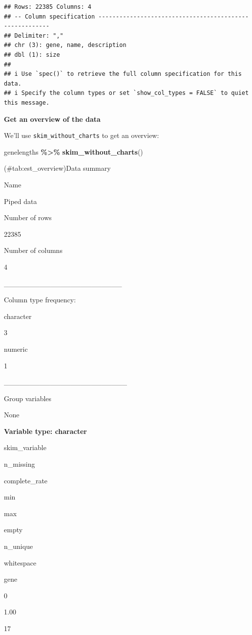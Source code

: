 \documentclass[
]{book}
\newenvironment{Shaded}{\begin{snugshade}}{\end{snugshade}}
\newcommand{\FunctionTok}[1]{\textcolor[rgb]{0.13,0.29,0.53}{\textbf{#1}}}
\newcommand{\NormalTok}[1]{#1}
\newcommand{\SpecialCharTok}[1]{\textcolor[rgb]{0.81,0.36,0.00}{\textbf{#1}}}
\begin{document}
\begin{verbatim}
## Rows: 22385 Columns: 4
## -- Column specification --------------------------------------------------------
## Delimiter: ","
## chr (3): gene, name, description
## dbl (1): size
## 
## i Use `spec()` to retrieve the full column specification for this data.
## i Specify the column types or set `show_col_types = FALSE` to quiet this message.
\end{verbatim}

\textbf{Get an overview of the data}

We'll use \texttt{skim\_without\_charts} to get an overview:

\begin{Shaded}
\begin{Highlighting}[]
\NormalTok{genelengths }\SpecialCharTok{\%\textgreater{}\%}
  \FunctionTok{skim\_without\_charts}\NormalTok{()}
\end{Highlighting}
\end{Shaded}

(\#tab:est\_overview)Data summary

Name

Piped data

Number of rows

22385

Number of columns

4

\_\_\_\_\_\_\_\_\_\_\_\_\_\_\_\_\_\_\_\_\_\_\_

Column type frequency:

character

3

numeric

1

\_\_\_\_\_\_\_\_\_\_\_\_\_\_\_\_\_\_\_\_\_\_\_\_

Group variables

None

\textbf{Variable type: character}

skim\_variable

n\_missing

complete\_rate

min

max

empty

n\_unique

whitespace

gene

0

1.00

17
\end{document}
